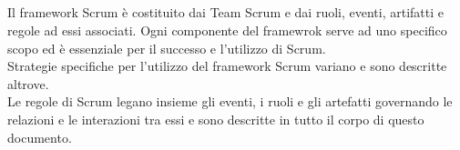 \subsection*{\color{SteelBlue}{Scrum Framework}}%
\label{sec:framework}
Il framework Scrum \`e costituito dai Team Scrum e dai ruoli, eventi, artifatti e regole ad essi associati. Ogni componente del 
framewrok serve ad uno specifico scopo ed \`e essenziale per il successo e l'utilizzo di Scrum.
\newline
\\Strategie specifiche per l'utilizzo del framework Scrum variano e sono descritte altrove.
\newline
\\ Le regole di Scrum legano insieme gli eventi, i ruoli e gli artefatti governando le relazioni e le interazioni tra essi e 
sono descritte in tutto il corpo di questo documento.

